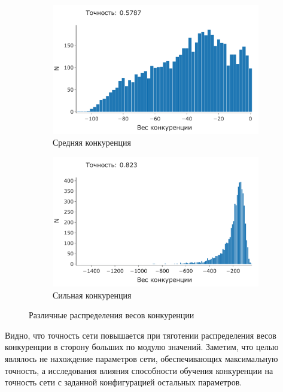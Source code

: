 \documentclass[a4paper]{article}
\begin{document}
\begin{figure}[H]
\begin{subfigure}{0.45\textwidth}
    \includegraphics[width=\textwidth,keepaspectratio=true]{competition_distribution_medium_good_ru.pdf}
    \caption{Средняя конкуренция} 
\end{subfigure}
\begin{subfigure}{0.45\textwidth}
    \includegraphics[width=\textwidth,keepaspectratio=true]{competition_distribution_best_ru.pdf}
    \caption{Сильная конкуренция}
    \label{fig:best_competition}
\end{subfigure}
\caption{Различные распределения весов конкуренции}
\label{fig:competition_distributions}
\end{figure}

Видно, что точность сети повышается при тяготении распределения весов конкуренции в сторону больших по модулю значений. Заметим, что целью являлось не нахождение параметров сети, обеспечивающих максимальную точность, а исследования влияния способности обучения конкуренции на точность сети с заданной конфигурацией остальных параметров.
\end{document}
